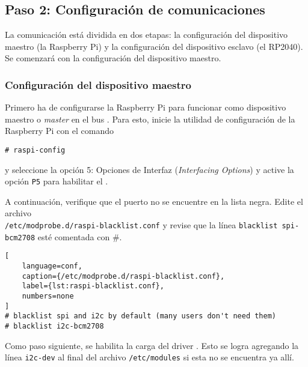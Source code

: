 %
%

\subsection{Paso 2: Configuración de comunicaciones \IIC}%
\label{sec:step2}
La comunicación está dividida en dos etapas: la configuración del dispositivo maestro (la Raspberry Pi)
y la configuración del dispositivo esclavo (el RP2040).
Se comenzará con la configuración del dispositivo maestro.

\subsubsection*{Configuración del dispositivo maestro}

Primero ha de configurarse la Raspberry Pi para funcionar como dispositivo maestro o \emph{master} en el bus \IIC.
Para esto, inicie la utilidad de configuración de la Raspberry Pi con el comando

\begin{Verbatim}
# raspi-config
\end{Verbatim}

\noindent y seleccione la opción 5: Opciones de Interfaz (\emph{Interfacing Options}) y active la opción \texttt{P5} para habilitar el \IIC.

A continuación, verifique que el puerto \IIC no se encuentre en la lista negra.
Edite el archivo \\\texttt{/etc/modprobe.d/raspi-blacklist.conf} y revise que la línea \texttt{blacklist spi-bcm2708} esté comentada con \#.

\begin{lstlisting}[
	language=conf,
	caption={/etc/modprobe.d/raspi-blacklist.conf},
	label={lst:raspi-blacklist.conf},
	numbers=none
]
# blacklist spi and i2c by default (many users don't need them)
# blacklist i2c-bcm2708
\end{lstlisting}

Como paso siguiente, se habilita la carga del driver \IIC.
Esto se logra agregando la línea \texttt{i2c-dev} al final del archivo \texttt{/etc/modules} si esta no se encuentra ya allí.

